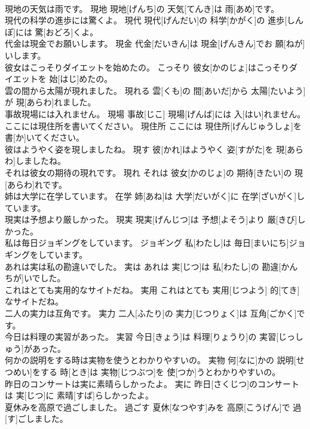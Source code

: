\documentclass[8pt]{extreport}
\begin{document}
\begin{CJK}{UTF8}{min}
\\	現地の天気は雨です。	現地	現地[げんち]の 天気[てんき]は 雨[あめ]です。	
\\	現代の科学の進歩には驚くよ。	現代	現代[げんだい]の 科学[かがく]の 進歩[しんぽ]には 驚[おどろ]くよ。	
\\	代金は現金でお願いします。	現金	代金[だいきん]は 現金[げんきん]でお 願[ねが]いします。	
\\	彼女はこっそりダイエットを始めたの。	こっそり	彼女[かのじょ]はこっそりダイエットを 始[はじ]めたの。	
\\	雲の間から太陽が現れました。	現れる	雲[くも]の 間[あいだ]から 太陽[たいよう]が 現[あらわ]れました。	
\\	事故現場には入れません。	現場	事故[じこ] 現場[げんば]には 入[はい]れません。	
\\	ここには現住所を書いてください。	現住所	ここには 現住所[げんじゅうしょ]を 書[か]いてください。	
\\	彼はようやく姿を現しましたね。	現す	彼[かれ]はようやく 姿[すがた]を 現[あらわ]しましたね。	
\\	それは彼女の期待の現れです。	現れ	それは 彼女[かのじょ]の 期待[きたい]の 現[あらわ]れです。	
\\	姉は大学に在学しています。	在学	姉[あね]は 大学[だいがく]に 在学[ざいがく]しています。	
\\	現実は予想より厳しかった。	現実	現実[げんじつ]は 予想[よそう]より 厳[きび]しかった。	
\\	私は毎日ジョギングをしています。	ジョギング	私[わたし]は 毎日[まいにち]ジョギングをしています。	
\\	あれは実は私の勘違いでした。	実は	あれは 実[じつ]は 私[わたし]の 勘違[かんちが]いでした。	
\\	これはとても実用的なサイトだね。	実用	これはとても 実用[じつよう] 的[てき]なサイトだね。	
\\	二人の実力は互角です。	実力	二人[ふたり]の 実力[じつりょく]は 互角[ごかく]です。	
\\	今日は料理の実習があった。	実習	今日[きょう]は 料理[りょうり]の 実習[じっしゅう]があった。	
\\	何かの説明をする時は実物を使うとわかりやすいの。	実物	何[なに]かの 説明[せつめい]をする 時[とき]は 実物[じつぶつ]を 使[つか]うとわかりやすいの。	
\\	昨日のコンサートは実に素晴らしかったよ。	実に	昨日[さくじつ]のコンサートは 実[じつ]に 素晴[すば]らしかったよ。	
\\	夏休みを高原で過ごしました。	過ごす	夏休[なつやす]みを 高原[こうげん]で 過[す]ごしました。	

\end{CJK}
\end{document}
